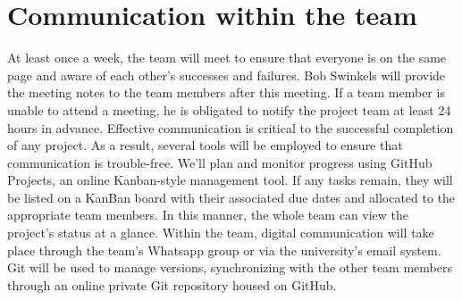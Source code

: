 \section{Communication within the team}

At least once a week, the team will meet to ensure that everyone is on the same page and aware of each other's successes and failures.
\justify
Bob Swinkels will provide the meeting notes to the team members after this meeting. If a team member is unable to attend a meeting, he is obligated to notify the project team at least 24 hours in advance.
Effective communication is critical to the successful completion of any project. As a result, several tools will be employed to ensure that communication is trouble-free.
\justify
We'll plan and monitor progress using GitHub Projects, an online Kanban-style management tool. If any tasks remain, they will be listed on a KanBan board with their associated due dates and allocated to the appropriate team members. In this manner, the whole team can view the project's status at a glance. 
\justify
Within the team, digital communication will take place through the team's Whatsapp group or via the university's email system. 
\justify
Git will be used to manage versions, synchronizing with the other team members through an online private Git repository housed on GitHub.
